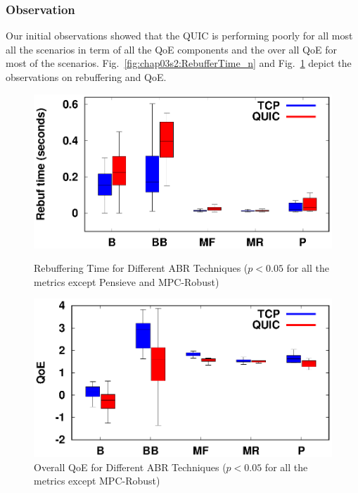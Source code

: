 \subsubsection{Observation}
Our initial observations showed that the QUIC is performing poorly for all most all the scenarios in term of all the QoE components and the over all QoE for most of the scenarios. Fig.~\ref{fig:chap03s2:RebufferTime_n} and Fig.~\ref{fig:chap03s2:QOE_n} depict the observations on rebuffering and QoE.
\begin{figure}[!h]
%	
	\begin{minipage}[t]{0.48\linewidth}
		\includegraphics[width=\linewidth]{img/QUIC/rebuf_box}
		\caption{\label{fig:chap03s2:RebufferTime_n}Rebuffering Time for Different ABR Techniques ($p<0.05$ for all the metrics except Pensieve and MPC-Robust)}
	\end{minipage}\hfill
	\begin{minipage}[t]{0.48\linewidth}
		\includegraphics[width=\linewidth]{img/QUIC/qoe_box}
		\caption{\label{fig:chap03s2:QOE_n}Overall QoE for Different ABR Techniques ($p<0.05$ for all the metrics except MPC-Robust)}
	\end{minipage}
\end{figure}

